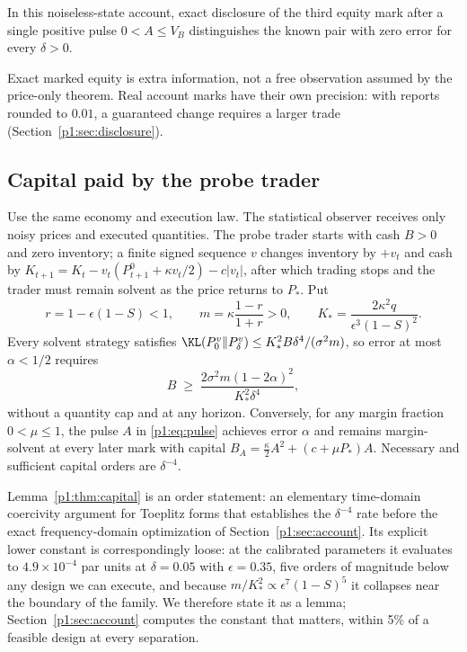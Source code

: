 \begin{proposition}\label{p1:prop:disclosure}
In this noiseless-state account, exact disclosure of the third equity mark after a single positive pulse $0<A\le V_B$ distinguishes the known pair with zero error for every $\delta>0$.
\end{proposition}

Exact marked equity is extra information, not a free observation assumed by the price-only theorem. Real account marks have their own precision: with reports rounded to $0.01$, a guaranteed change requires a larger trade (Section~\ref{p1:sec:disclosure}).

\subsection{Capital paid by the probe trader}

\begin{lemma}\label{p1:thm:capital}
Use the same economy and execution law. The statistical observer receives only noisy prices and executed quantities. The probe trader starts with cash $B>0$ and zero inventory; a finite signed sequence $v$ changes inventory by $+v_t$ and cash by $K_{t+1}=K_t-v_t(P^0_{t+1}+\kappa v_t/2)-c|v_t|$, after which trading stops and the trader must remain solvent as the price returns to $P_*$. Put
\[
r=1-\epsilon(1-S)<1,\qquad m=\kappa\frac{1-r}{1+r}>0,\qquad K_*=\frac{2\kappa^2q}{\epsilon^3(1-S)^2}.
\]
Every solvent strategy satisfies $\KL(P_0^v\|P_\delta^v)\le K_*^2B\delta^4/(\sigma^2m)$, so error at most $\alpha<1/2$ requires
\begin{equation}\label{p1:eq:Bmin}
B\;\ge\;\frac{2\sigma^2m(1-2\alpha)^2}{K_*^2\delta^4},
\end{equation}
without a quantity cap and at any horizon. Conversely, for any margin fraction $0<\mu\le1$, the pulse $A$ in \eqref{p1:eq:pulse} achieves error $\alpha$ and remains margin-solvent at every later mark with capital $B_A=\tfrac{\kappa}{2}A^2+(c+\mu P_*)A$. Necessary and sufficient capital orders are $\delta^{-4}$.
\end{lemma}

Lemma~\ref{p1:thm:capital} is an order statement: an elementary time-domain coercivity argument for Toeplitz forms that establishes the $\delta^{-4}$ rate before the exact frequency-domain optimization of Section~\ref{p1:sec:account}. Its explicit lower constant is correspondingly loose: at the calibrated parameters it evaluates to $4.9\times10^{-4}$ par units at $\delta=0.05$ with $\epsilon=0.35$, five orders of magnitude below any design we can execute, and because $m/K_*^2\propto\epsilon^7(1-S)^5$ it collapses near the boundary of the family. We therefore state it as a lemma; Section~\ref{p1:sec:account} computes the constant that matters, within 5\% of a feasible design at every separation.

